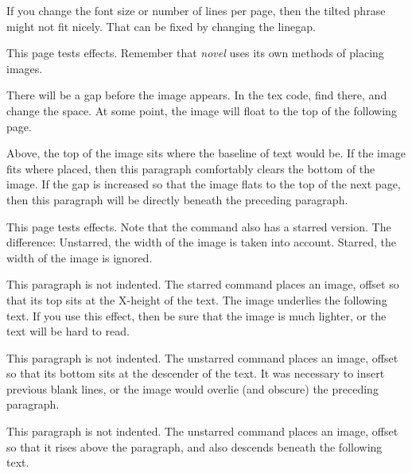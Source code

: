 \documentclass[test]{novel} %
\begin{document}
If you change the font size or number of lines per page, then the tilted phrase might not fit nicely. That can be fixed by changing the linegap.

\clearpage



This page tests \string\FloatImage\space effects. Remember that \textit{novel} uses its own methods of placing images.

There will be a gap before the image appears. In the tex code, find \string\vspace\space there, and change the space. At some point, the image will float to the top of the following page.

\vspace{7\nbs}


Above, the top of the image sits where the baseline of text would be. If the image fits where placed, then this paragraph comfortably clears the bottom of the image. If the gap is increased so that the image flats to the top of the next page, then this paragraph will be directly beneath the preceding paragraph.



\clearpage


This page tests \string\InlineImage\space effects. Note that the command also has a starred version. The difference: Unstarred, the width of the image is taken into account. Starred, the width of the image is ignored.

\null

\noindent{}This paragraph is not indented. The starred command places an image, offset so that its top sits at the X-height of the text. The image underlies the following text. If you use this effect, then be sure that the image is much lighter, or the text will be hard to read.

\null\null\null

\noindent{}This paragraph is not indented. The unstarred command places an image, offset so that its bottom sits at the descender of the text. It was necessary to insert previous blank lines, or the image would overlie (and obscure) the preceding paragraph.

\null\null

\noindent{}This paragraph is not indented. The unstarred command places an image, offset so that it rises above the paragraph, and also descends beneath the following text. 
\end{document}
